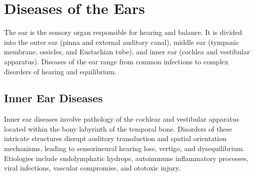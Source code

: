\chapter{Diseases of the Ears}
\label{ch:ears}
The ear is the sensory organ responsible for hearing and balance. It is divided into the outer ear (pinna and external auditory canal), middle ear (tympanic membrane, ossicles, and Eustachian tube), and inner ear (cochlea and vestibular apparatus). Diseases of the ear range from common infections to complex disorders of hearing and equilibrium.

\section{Inner Ear Diseases}




Inner ear diseases involve pathology of the cochlear and vestibular apparatus located within the bony labyrinth of the temporal bone. Disorders of these intricate structures disrupt auditory transduction and spatial orientation mechanisms, leading to sensorineural hearing loss, vertigo, and dysequilibrium. Etiologies include endolymphatic hydrops, autoimmune inflammatory processes, viral infections, vascular compromise, and ototoxic injury.





\label{sec:Inner Ear Diseases}

